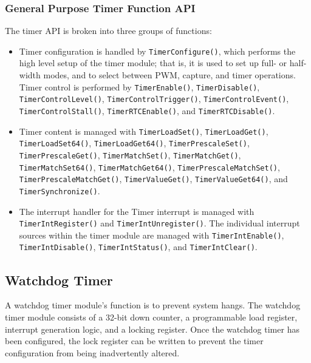 \documentclass{article}
\begin{document}
\subsubsection{General Purpose Timer Function API}
The timer API is broken into three groups of functions:
\begin{itemize}
    \item Timer configuration is handled by
          \texttt{TimerConfigure()}, which performs the high
          level setup of the timer module; that is, it is used to set
          up full- or half-width modes, and to select between PWM,
          capture, and timer operations. Timer control is performed by
          \texttt{TimerEnable()},
          \texttt{TimerDisable()},
          \texttt{TimerControlLevel()},
          \texttt{TimerControlTrigger()},
          \texttt{TimerControlEvent()},
          \texttt{TimerControlStall()},
          \texttt{TimerRTCEnable()}, and
          \texttt{TimerRTCDisable()}.
    \item Timer content is managed with \texttt{TimerLoadSet()},
          \texttt{TimerLoadGet()},
          \texttt{TimerLoadSet64()},
          \texttt{TimerLoadGet64()},
          \texttt{TimerPrescaleSet()},
          \texttt{TimerPrescaleGet()},
          \texttt{TimerMatchSet()},
          \texttt{TimerMatchGet()},
          \texttt{TimerMatchSet64()},
          \texttt{TimerMatchGet64()},
          \texttt{TimerPrescaleMatchSet()},
          \texttt{TimerPrescaleMatchGet()},
          \texttt{TimerValueGet()},
          \texttt{TimerValueGet64()}, and
          \texttt{TimerSynchronize()}.
    \item The interrupt handler for the Timer interrupt is managed with
          \texttt{TimerIntRegister()} and
          \texttt{TimerIntUnregister()}. The individual
          interrupt sources within the timer module are managed with
          \texttt{TimerIntEnable()},
          \texttt{TimerIntDisable()},
          \texttt{TimerIntStatus()}, and
          \texttt{TimerIntClear()}.
\end{itemize}
\subsection{Watchdog Timer}
A watchdog timer module's function is to prevent system hangs. The
watchdog timer module consists of a 32-bit down counter, a programmable
load register, interrupt generation logic, and a locking register. Once
the watchdog timer has been configured, the lock register can be
written to prevent the timer configuration from being inadvertently
altered.
\end{document}
